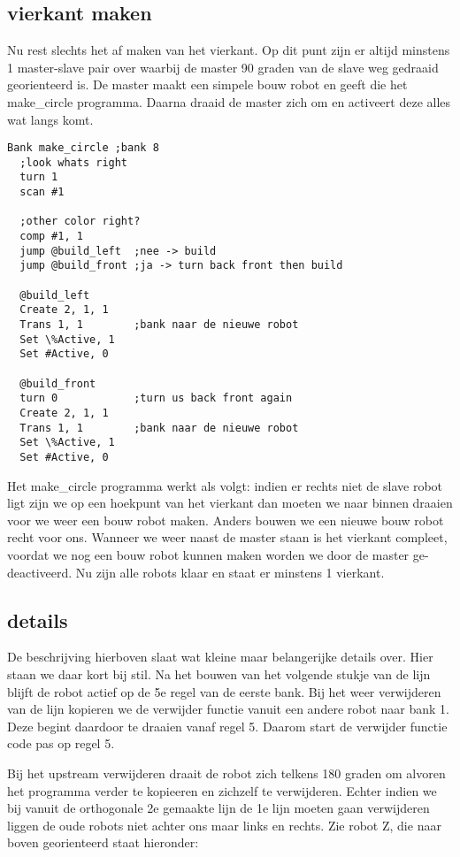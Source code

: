 \documentclass[10pt]{article}
\begin{document}
\subsection{vierkant maken}
Nu rest slechts het af maken van het vierkant. Op dit punt zijn er altijd minstens 1 master-slave pair over waarbij de master 90 graden van de slave weg gedraaid georienteerd is. De master maakt een simpele bouw robot en geeft die het make\_circle programma. Daarna draaid de master zich om en activeert deze alles wat langs komt.


\begin{verbatim}
Bank make_circle ;bank 8
  ;look whats right
  turn 1
  scan #1
  
  ;other color right?
  comp #1, 1 
  jump @build_left  ;nee -> build 
  jump @build_front ;ja -> turn back front then build 

  @build_left
  Create 2, 1, 1
  Trans 1, 1        ;bank naar de nieuwe robot
  Set \%Active, 1
  Set #Active, 0
  
  @build_front
  turn 0            ;turn us back front again
  Create 2, 1, 1
  Trans 1, 1        ;bank naar de nieuwe robot
  Set \%Active, 1
  Set #Active, 0
\end{verbatim}

Het make\_circle programma werkt als volgt: indien er rechts niet de slave robot ligt zijn we op een hoekpunt van het vierkant dan moeten we naar binnen draaien voor we weer een bouw robot maken. Anders bouwen we een nieuwe bouw robot recht voor ons. Wanneer we weer naast de master staan is het vierkant compleet, voordat we nog een bouw robot kunnen maken worden we door de master ge-deactiveerd. Nu zijn alle robots klaar en staat er minstens 1 vierkant.

\subsection{details}
De beschrijving hierboven slaat wat kleine maar belangerijke details over. Hier staan we daar kort bij stil. Na het bouwen van het volgende stukje van de lijn blijft de robot actief op de 5e regel van de eerste bank. Bij het weer verwijderen van de lijn kopieren we de verwijder functie vanuit een andere robot naar bank 1. Deze begint daardoor te draaien vanaf regel 5. Daarom start de verwijder functie code pas op regel 5.

Bij het upstream verwijderen draait de robot zich telkens 180 graden om alvoren het programma verder te kopieeren en zichzelf te verwijderen. Echter indien we bij vanuit de orthogonale 2e gemaakte lijn de 1e lijn moeten gaan verwijderen liggen de oude robots niet achter ons maar links en rechts. Zie robot Z, die naar boven georienteerd staat hieronder:
\end{document}
